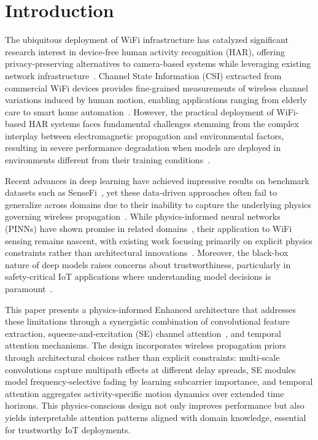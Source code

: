 \documentclass[journal]{IEEEtran}
\begin{document}
\section{Introduction}
The ubiquitous deployment of WiFi infrastructure has catalyzed significant research interest in device-free human activity recognition (HAR), offering privacy-preserving alternatives to camera-based systems while leveraging existing network infrastructure~\cite{liu2024wifi,wang2023privacy}. Channel State Information (CSI) extracted from commercial WiFi devices provides fine-grained measurements of wireless channel variations induced by human motion, enabling applications ranging from elderly care to smart home automation~\cite{zhang2023attention,iotj2023applications}. However, the practical deployment of WiFi-based HAR systems faces fundamental challenges stemming from the complex interplay between electromagnetic propagation and environmental factors, resulting in severe performance degradation when models are deployed in environments different from their training conditions~\cite{li2024cross,domain2023shift}.

Recent advances in deep learning have achieved impressive results on benchmark datasets such as SenseFi~\cite{yang2023sensefi}, yet these data-driven approaches often fail to generalize across domains due to their inability to capture the underlying physics governing wireless propagation~\cite{chen2022physics,pinn2023wireless}. While physics-informed neural networks (PINNs) have shown promise in related domains~\cite{raissi2019physics,karniadakis2021physics}, their application to WiFi sensing remains nascent, with existing work focusing primarily on explicit physics constraints rather than architectural innovations~\cite{physics2023sensing}. Moreover, the black-box nature of deep models raises concerns about trustworthiness, particularly in safety-critical IoT applications where understanding model decisions is paramount~\cite{trustworthy2023iot,calibration_guo2017}.

This paper presents a physics-informed Enhanced architecture that addresses these limitations through a synergistic combination of convolutional feature extraction, squeeze-and-excitation (SE) channel attention~\cite{se_networks2018}, and temporal attention mechanisms. The design incorporates wireless propagation priors~\cite{goldsmith2005wireless} through architectural choices rather than explicit constraints: multi-scale convolutions capture multipath effects at different delay spreads, SE modules model frequency-selective fading by learning subcarrier importance, and temporal attention aggregates activity-specific motion dynamics over extended time horizons. This physics-conscious design not only improves performance but also yields interpretable attention patterns aligned with domain knowledge, essential for trustworthy IoT deployments.
\end{document}
